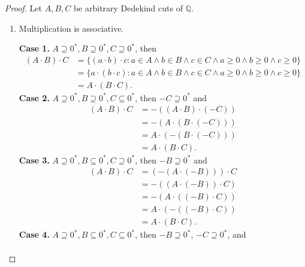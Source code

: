 \begin{proof}
    Let $A, B, C$ be arbitrary Dedekind cuts of $\mathbb{Q}$.
    \begin{enumerate}[label={(F\arabic*)}, start=5]
        \item Multiplication is associative.

              \textbf{Case 1.} $A\supseteq {0}^{*}, B\supseteq {0}^{*}, C\supseteq {0}^{*}$, then
              \begin{align*}
                  (A\cdot B)\cdot C & = \{ (a\cdot b)\cdot c : a\in A\land b\in B\land c\in C\land a\ge 0\land b\ge 0\land c\ge 0 \} \\
                                    & = \{ a\cdot (b\cdot c) : a\in A\land b\in B\land c\in C\land a\ge 0\land b\ge 0\land c\ge 0 \} \\
                                    & = A\cdot (B\cdot C).
              \end{align*}
              \textbf{Case 2.} $A\supseteq {0}^{*}, B\supseteq {0}^{*}, C\subseteq {0}^{*}$, then $-C\supseteq {0}^{*}$ and
              \begin{align*}
                  (A\cdot B)\cdot C & = -\left( (A\cdot B)\cdot (-C) \right)  \\
                                    & = -\left( A\cdot (B \cdot (-C)) \right) \\
                                    & = A\cdot (-(B\cdot (-C)))               \\
                                    & = A\cdot (B\cdot C).
              \end{align*}
              \textbf{Case 3.} $A\supseteq {0}^{*}, B\subseteq {0}^{*}, C\supseteq {0}^{*}$, then $-B\supseteq {0}^{*}$ and
              \begin{align*}
                  (A\cdot B)\cdot C & = (-(A\cdot (-B)))\cdot C \\
                                    & = -((A\cdot (-B))\cdot C) \\
                                    & = -(A\cdot ((-B)\cdot C)) \\
                                    & = A\cdot (-((-B)\cdot C)) \\
                                    & = A\cdot (B\cdot C).
              \end{align*}
              \textbf{Case 4.} $A\supseteq {0}^{*}, B\subseteq {0}^{*}, C\subseteq {0}^{*}$, then $-B\supseteq {0}^{*}$, $-C\supseteq {0}^{*}$, and
              \begin{align*}

\end{align*}
\end{enumerate}
\end{proof}
